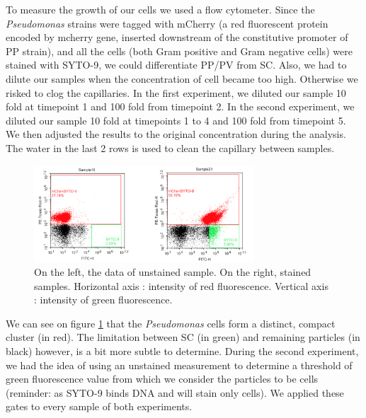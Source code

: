 \documentclass[a4paper, 10pt, conference]{ieeeconf}   %
\begin{document}
To measure the growth of our cells we used a flow cytometer. 
Since the \textit{Pseudomonas} strains were tagged with mCherry (a red fluorescent protein encoded by mcherry gene, inserted downstream of the constitutive promoter of PP strain), and all the cells (both Gram positive and Gram negative cells) were stained with SYTO-9, we could differentiate PP/PV from SC. Also, we had to dilute our samples when the concentration of cell became too high. Otherwise we risked to clog the capillaries.
In the first experiment, we diluted our sample 10 fold at timepoint 1 and 100 fold from timepoint 2. In the second experiment, we diluted our sample 10 fold at timepoints 1 to 4 and 100 fold from timepoint 5.
We then adjusted the results to the original concentration during the analysis. The water in the last 2 rows is used to clean the capillary between samples.
%  

\begin{figure} [H]
	\centering
	 
		\includegraphics[width=8.2cm]{scatterplot.PNG}
		\caption{On the left, the data of unstained sample. On the right, stained samples. Horizontal axis : intensity of red fluorescence. Vertical axis : intensity of green fluorescence.}
		\label{scatterplot}
	  
\end{figure}

We can see on figure \ref{scatterplot} that the \textit{Pseudomonas} cells form a distinct, compact cluster (in red). The limitation between SC (in green) and remaining particles (in black) however, is a bit more subtle to determine. During the second experiment, we had the idea of using an unstained measurement to determine a threshold of green fluorescence value from which we consider the particles to be cells (reminder: as SYTO-9 binds DNA and will stain only cells). We applied these gates to every sample
of both experiments.
\end{document}
